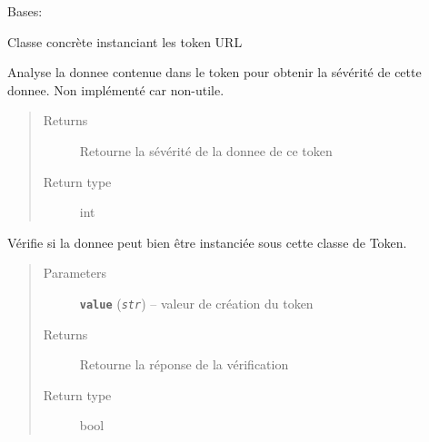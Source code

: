 \documentclass[letterpaper,10pt,english]{sphinxmanual}
\begin{document}

\begin{fulllineitems}
\label{loganalyser:loganalyser.token.URL}
Bases: {\hyperref[loganalyser:loganalyser.token.Token]{\emph{}}}

Classe concrète instanciant les token URL

\begin{fulllineitems}
\label{loganalyser:loganalyser.token.URL._Token__analyse}
Analyse la donnee contenue dans le token pour obtenir la sévérité de cette donnee. Non implémenté car non-utile.
\begin{quote}\begin{description}
\item[{Returns}] \leavevmode
Retourne la sévérité de la donnee de ce token

\item[{Return type}] \leavevmode
int

\end{description}\end{quote}

\end{fulllineitems}


\begin{fulllineitems}
\label{loganalyser:loganalyser.token.URL._Token__verifier_type}
Vérifie si la donnee peut bien être instanciée sous cette classe de Token.
\begin{quote}\begin{description}
\item[{Parameters}] \leavevmode
\textbf{\texttt{value}} (\emph{\texttt{str}}) -- valeur de création du token

\item[{Returns}] \leavevmode
Retourne la réponse de la vérification

\item[{Return type}] \leavevmode
bool

\end{description}\end{quote}

\end{fulllineitems}


\end{fulllineitems}
\end{document}
